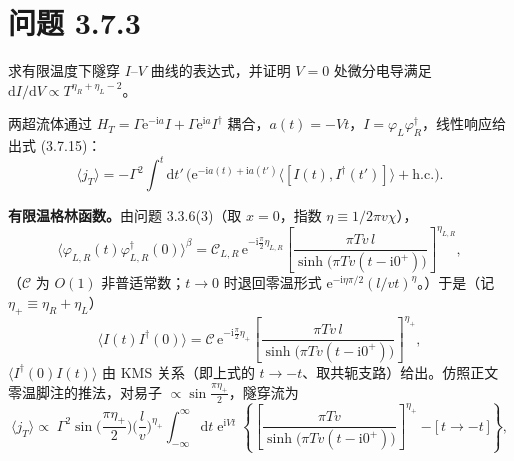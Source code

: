 \section*{问题 3.7.3}
\begin{problem}
求有限温度下隧穿 $I$--$V$ 曲线的表达式，并证明 $V=0$ 处微分电导满足 $\mathrm{d}I/\mathrm{d}V\propto T^{\eta_R+\eta_L-2}$。
\end{problem}
\solution

两超流体通过 $H_T=\Gamma\mathrm{e}^{-\mathrm{i}a}I+\Gamma\mathrm{e}^{\mathrm{i}a}I^{\dagger}$ 耦合，$a(t)=-Vt$，$I=\varphi_L\varphi_R^{\dagger}$，线性响应给出式 (3.7.15)：
\begin{equation*}
\langle j_T\rangle=-\Gamma^{2}\int^{t}\mathrm{d}t'\,
\Big(\mathrm{e}^{-\mathrm{i}a(t)+\mathrm{i}a(t')}\langle[I(t),I^{\dagger}(t')]\rangle+\mathrm{h.c.}\Big) .
\end{equation*}

\textbf{有限温格林函数。}由问题 3.3.6(3)（取 $x=0$，指数 $\eta\equiv1/2\pi v\chi$），
\begin{equation*}
\big\langle\varphi_{L,R}(t)\varphi_{L,R}^{\dagger}(0)\big\rangle^{\beta}
=\mathcal{C}_{L,R}\,\mathrm{e}^{-\mathrm{i}\frac{\pi}{2}\eta_{L,R}}
\left[\frac{\pi T v\,l}{\sinh\big(\pi T v(t-\mathrm{i}0^{+})\big)}\right]^{\eta_{L,R}} ,
\end{equation*}
（$\mathcal{C}$ 为 $O(1)$ 非普适常数；$t\to0$ 时退回零温形式 $\mathrm{e}^{-\mathrm{i}\eta\pi/2}(l/vt)^{\eta}$。）于是（记 $\eta_+\equiv\eta_R+\eta_L$）
\begin{equation*}
\langle I(t)I^{\dagger}(0)\rangle
=\mathcal{C}\,\mathrm{e}^{-\mathrm{i}\frac{\pi}{2}\eta_+}
\left[\frac{\pi T v\,l}{\sinh\big(\pi T v(t-\mathrm{i}0^{+})\big)}\right]^{\eta_+} ,
\end{equation*}
$\langle I^{\dagger}(0)I(t)\rangle$ 由 KMS 关系（即上式的 $t\to-t$、取共轭支路）给出。仿照正文零温脚注的推法，对易子 $\propto\sin\frac{\pi\eta_+}{2}$，隧穿流为
\begin{equation*}
\langle j_T\rangle
\propto\;\Gamma^{2}\sin\!\Big(\frac{\pi\eta_+}{2}\Big)\Big(\frac{l}{v}\Big)^{\eta_+}
\int_{-\infty}^{\infty}\mathrm{d}t\;\mathrm{e}^{\mathrm{i}Vt}\;
\left\{\left[\frac{\pi T v}{\sinh\big(\pi T v(t-\mathrm{i}0^{+})\big)}\right]^{\eta_+}
-\big[\,t\to-t\,\big]\right\},
\end{equation*}


